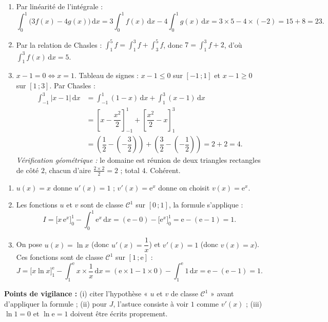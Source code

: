 \documentclass[11pt]{article}
\begin{document}
\begin{corrige}
\begin{enumerate}
\item Par linéarité de l'intégrale :
\[
\int_0^1 \big(3f(x)-4g(x)\big)\,\mathrm{d}x = 3\int_0^1 f(x)\,\mathrm{d}x - 4\int_0^1 g(x)\,\mathrm{d}x = 3\times 5 - 4\times(-2) = 15+8 = \boxed{23}.
\]
\item Par la relation de Chasles : $\displaystyle\int_1^5 f = \int_1^3 f + \int_3^5 f$, donc $7 = \displaystyle\int_1^3 f + 2$, d'où $\displaystyle\int_1^3 f(x)\,\mathrm{d}x = \boxed{5}$.
\item $x-1 = 0 \Leftrightarrow x=1$. Tableau de signes : $x-1\le 0$ sur $[-1\,;1]$ et $x-1\ge 0$ sur $[1\,;3]$. Par Chasles :
\begin{align*}
\int_{-1}^{3} |x-1|\,\mathrm{d}x &= \int_{-1}^{1} (1-x)\,\mathrm{d}x + \int_{1}^{3} (x-1)\,\mathrm{d}x\\
&= \left[x-\dfrac{x^2}{2}\right]_{-1}^{1} + \left[\dfrac{x^2}{2}-x\right]_{1}^{3}\\
&= \left(\dfrac{1}{2}-\left(-\dfrac{3}{2}\right)\right) + \left(\dfrac{3}{2}-\left(-\dfrac{1}{2}\right)\right) = 2+2 = \boxed{4}.
\end{align*}
\emph{Vérification géométrique :} le domaine est réunion de deux triangles rectangles de côté $2$, chacun d'aire $\frac{2\times 2}{2}=2$ ; total $4$. Cohérent.
\end{enumerate}
\end{corrige}

\begin{corrige}
\begin{enumerate}
\item $u(x)=x$ donne $u'(x)=1$ ; $v'(x)=\mathrm{e}^x$ donne on choisit $v(x)=\mathrm{e}^x$.
\item Les fonctions $u$ et $v$ sont de classe $\mathcal{C}^1$ sur $[0\,;1]$, la formule s'applique :
\[
I = \big[x\,\mathrm{e}^x\big]_0^1 - \int_0^1 \mathrm{e}^x\,\mathrm{d}x = (\mathrm{e}-0) - \big[\mathrm{e}^x\big]_0^1 = \mathrm{e}-(\mathrm{e}-1) = \boxed{1}.
\]
\item On pose $u(x)=\ln x$ (donc $u'(x)=\dfrac{1}{x}$) et $v'(x)=1$ (donc $v(x)=x$). Ces fonctions sont de classe $\mathcal{C}^1$ sur $[1\,;\mathrm{e}]$ :
\[
J = \big[x\ln x\big]_1^{\mathrm{e}} - \int_1^{\mathrm{e}} x\times\dfrac{1}{x}\,\mathrm{d}x = (\mathrm{e}\times 1 - 1\times 0) - \int_1^{\mathrm{e}} 1\,\mathrm{d}x = \mathrm{e} - (\mathrm{e}-1) = \boxed{1}.
\]
\end{enumerate}
\textbf{Points de vigilance :} (i) citer l'hypothèse « $u$ et $v$ de classe $\mathcal{C}^1$ » avant d'appliquer la formule ; (ii) pour $J$, l'astuce consiste à voir $1$ comme $v'(x)$ ; (iii) $\ln 1 = 0$ et $\ln\mathrm{e}=1$ doivent être écrits proprement.
\end{corrige}
\end{document}
